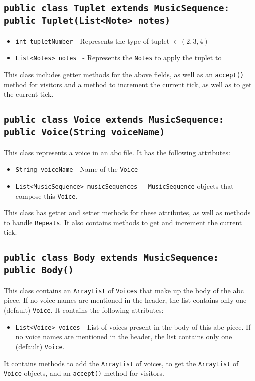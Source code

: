 \documentclass{article}
\begin{document}
\subsection*{{\tt public class Tuplet extends MusicSequence: public Tuplet(List<Note> notes)}}
\begin{itemize}
\item {\tt  int tupletNumber} - Represents the type of tuplet $\in (2,3,4)$
\item {\tt  List<Notes> notes } - Represents the {\tt Notes} to apply the tuplet to
\end{itemize}
This class includes getter methods for the above fields, as well as an {\tt accept() } method for visitors and a method to increment the current tick, as well as to get the current tick.

\subsection*{{\tt public class Voice extends MusicSequence: public Voice(String voiceName)}}
This class represents a voice in an abc file. It has the following attributes:
\begin{itemize}
\item {\tt String voiceName} - Name of the {\tt Voice}
\item {\tt List<MusicSequence> musicSequences - MusicSequence} objects that compose this {\tt Voice}.
\end{itemize}
This class has getter and setter methods for these attributes, as well as methods to handle {\tt Repeats}. It also contains methods to get and increment the current tick.

\subsection*{{\tt public class Body extends MusicSequence: public Body()}}
This class contains an {\tt ArrayList} of {\tt Voices} that make up the body of the abc piece. If no voice names are mentioned in the header, the list contains only one (default) {\tt Voice}. It contains the following attributes:
\begin{itemize}
\item {\tt List<Voice> voices} - List of voices present in the body of this abc piece. If no voice names are mentioned in the header, the list contains only one (default) {\tt Voice}.
\end{itemize}
It contains methods to add the {\tt ArrayList} of voices, to get the {\tt ArrayList} of {\tt Voice} objects, and an {\tt accept()} method for visitors.
\end{document}
